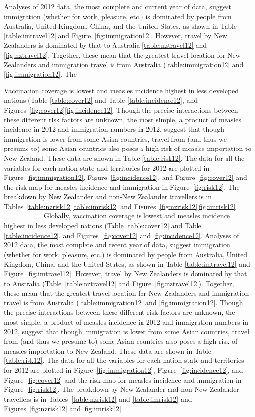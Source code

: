 \documentclass{article}
\begin{document}
\begin{itemize}
Analyses of 2012 data, the most complete and current year of data, suggest immigration (whether for work, pleasure, etc.) is dominated by people from Australia, United Kingdom, China, and the United States, as shown in Table \ref{table:imtravel12} and Figure~\ref{fig:immigration12}. However, travel by New Zealanders is dominated by that to Australia \ref{table:nztravel12} and \ref{fig:nztravel12}. Together, these mean that the greatest travel location for New Zealanders and immigration travel is from Australia (\ref{table:immigration12} and \ref{fig:immigration12}. The 



Vaccination coverage is lowest and measles incidence highest in less developed nations (Table \ref{table:cover12} and Table \ref{table:incidence12}, and Figures~\ref{fig:cover12}\ref{fig:incidence12}. Though the precise interactions between these different risk factors are unknown, the most simple, a product of measles incidence in 2012 and immigration numbers in 2012, suggest that though immigration is lower from some Asian countries, travel from (and thus we presume to) some Asian countries also poses a high risk of measles importation to New Zealand. These data are shown in Table \ref{table:risk12}. The data for all the variables for each nation state and territories for 2012 are plotted in Figure~\ref{fig:immigration12}, Figure~\ref{fig:incidence12}, and Figure~\ref{fig:cover12} and the risk map for measles incidence and immigration in Figure~\ref{fig:risk12}. The breakdown by New Zealander and non-New Zealander travellers is in Tables~\ref{table:nzrisk12}\ref{table:imrisk12} and Figures~\ref{fig:nzrisk12}\ref{fig:imrisk12}
=======
Globally, vaccination coverage is lowest and measles incidence highest in less developed nations (Table \ref{table:cover12} and Table \ref{table:incidence12}, and Figures~\ref{fig:cover12} and \ref{fig:incidence12}. Analyses of 2012 data, the most complete and recent year of data, suggest immigration (whether for work, pleasure, etc.) is dominated by people from Australia, United Kingdom, China, and the United States, as shown in Table \ref{table:imtravel12} and Figure~\ref{fig:imtravel12}. However, travel by New Zealanders is dominated by that to Australia (Table~\ref{table:nztravel12} and Figure~\ref{fig:nztravel12}). Together, these mean that the greatest travel location for New Zealanders and immigration travel is from Australia (\ref{table:immigration12} and \ref{fig:immigration12}. Though the precise interactions between these different risk factors are unknown, the most simple, a product of measles incidence in 2012 and immigration numbers in 2012, suggest that though immigration is lower from some Asian countries, travel from (and thus we presume to) some Asian countries also poses a high risk of measles importation to New Zealand. These data are shown in Table \ref{table:risk12}. The data for all the variables for each nation state and territories for 2012 are plotted in Figure~\ref{fig:immigration12}, Figure~\ref{fig:incidence12}, and Figure~\ref{fig:cover12} and the risk map for measles incidence and immigration in Figure~\ref{fig:risk12}. The breakdown by New Zealander and non-New Zealander travellers is in Tables~\ref{table:nzrisk12} and \ref{table:imrisk12} and Figures~\ref{fig:nzrisk12} and \ref{fig:imrisk12}

\end{itemize}
\end{document}
